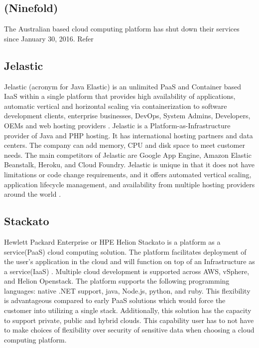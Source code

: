\subsection{(Ninefold)}

    The Australian based cloud computing platform has shut down their
    services since January 30, 2016. Refer \cite{www-ninefoldSite}

\subsection{Jelastic}

    Jelastic (acronym for Java Elastic) is an unlimited PaaS and
    Container based IaaS within a single platform that provides high
    availability of applications, automatic vertical and horizontal
    scaling via containerization to software development clients,
    enterprise businesses, DevOps, System Admins, Developers, OEMs and
    web hosting providers \cite{www-jelastic-2}. Jelastic is a
    Platform-as-Infrastructure provider of Java and PHP hosting.  It
    has international hosting partners and data centers. The company
    can add memory, CPU and disk space to meet customer needs. The
    main competitors of Jelastic are Google App Engine, Amazon Elastic
    Beanstalk, Heroku, and Cloud Foundry. Jelastic is unique in that it
    does not have limitations or code change requirements, and it
    offers automated vertical scaling, application lifecycle
    management, and availability from multiple hosting providers
    around the world \cite{www-jelastic-1}.

\subsection{Stackato}
    
    Hewlett Packard Enterprise or HPE Helion Stackato is a platform as
    a service(PaaS) cloud computing solution.  The platform
    facilitates deployment of the user’s application in the cloud and
    will function on top of an Infrastructure as a
    service(IaaS) \cite{www-hpe}. Multiple cloud development is
    supported across AWS, vSphere, and Helion Openstack.  The platform
    supports the following programming languages: native .NET support,
    java, Node.js, python, and ruby.  This flexibility is advantageous
    compared to early PaaS solutions which would force the customer
    into utilizing a single stack.  Additionally, this solution has
    the capacity to support private, public and hybrid clouds.
    \cite{www-virt} This capability user has to not have to make
    choices of flexibility over security of sensitive data when
    choosing a cloud computing platform.
 
